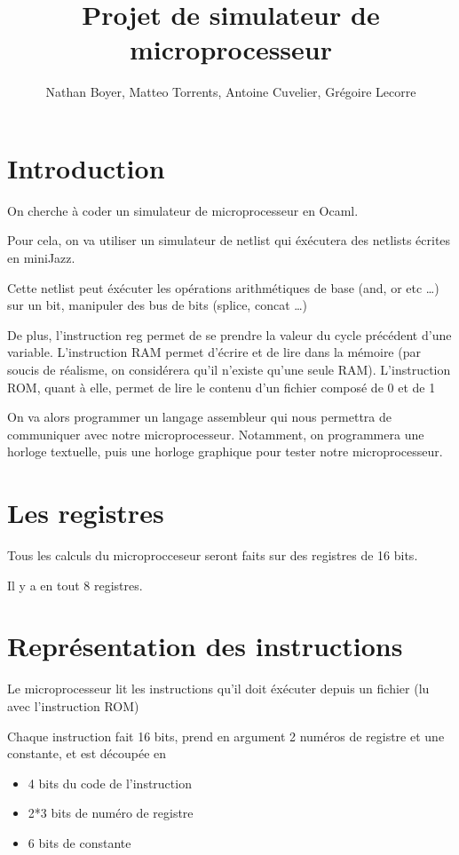 \documentclass[12pt,a4paper,french]{article}
\title{Projet de simulateur de microprocesseur}
\author{Nathan Boyer, Matteo Torrents, Antoine Cuvelier, Grégoire Lecorre}
\begin{document}
\maketitle

\section*{Introduction}

On cherche à coder un simulateur de microprocesseur en Ocaml.

Pour cela, on va utiliser un simulateur de netlist qui éxécutera des netlists écrites en miniJazz.

Cette netlist peut éxécuter les opérations arithmétiques de base (and, or etc \ldots) sur un bit, manipuler des bus de bits (splice, concat \ldots)

De plus, l'instruction reg permet de se prendre la valeur du cycle précédent d'une variable. L'instruction RAM permet d'écrire et de lire dans la mémoire
(par soucis de réalisme, on considérera qu'il n'existe qu'une seule RAM). L'instruction ROM, quant à elle, permet de lire le contenu d'un fichier composé de 0 et de 1

On va alors programmer un langage assembleur qui nous permettra de communiquer avec notre microprocesseur. Notamment, on programmera une horloge textuelle, puis une horloge graphique
pour tester notre microprocesseur.


\section{Les registres}

Tous les calculs du microprocceseur seront faits sur des registres de 16 bits.

Il y a en tout 8 registres.


\section{Représentation des instructions}

Le microprocesseur lit les instructions qu'il doit éxécuter depuis un fichier (lu avec l'instruction ROM)

Chaque instruction fait 16 bits, prend en argument 2 numéros de registre et une constante, et est découpée en

\begin{itemize}
    \item 4 bits du code de l'instruction
    \item 2*3 bits de numéro de registre
    \item 6 bits de constante
\end{itemize}
\end{document}
